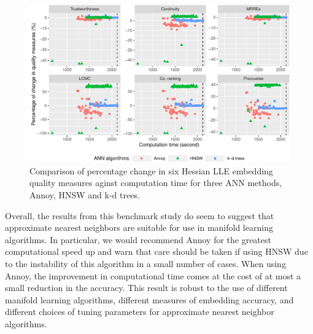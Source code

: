 \documentclass[12pt]{article}
\begin{document}
\begin{figure}

{\centering \includegraphics[width=1\linewidth]{mlann_jcgs_files/figure-latex/hllemeasure-1} 

}

\caption{Comparison of percentage change in six Hessian LLE embedding quality measures aginst computation time for three ANN methods, Annoy, HNSW and k-d trees. }\label{fig:hllemeasure}
\end{figure}

\begin{table}

\caption{\label{tab:nnmeasure}Quality measures using true nearest neighbors for four manifold learning methods. All quality measures range from 0 to 1 where higher value indicates a better embedding. }
\centering
{}
\end{table}

Overall, the results from this benchmark study do seem to suggest that approximate nearest neighbors are suitable for use in manifold learning algorithms. In particular, we would recommend Annoy for the greatest computational speed up and warn that care should be taken if using HNSW due to the instability of this algorithm in a small number of cases. When using Annoy, the improvement in computational time comes at the cost of at most a small reduction in the accuracy. This result is robust to the use of different manifold learning algorithms, different measures of embedding accuracy, and different choices of tuning parameters for approximate nearest neighbor algorithms.
\end{document}
